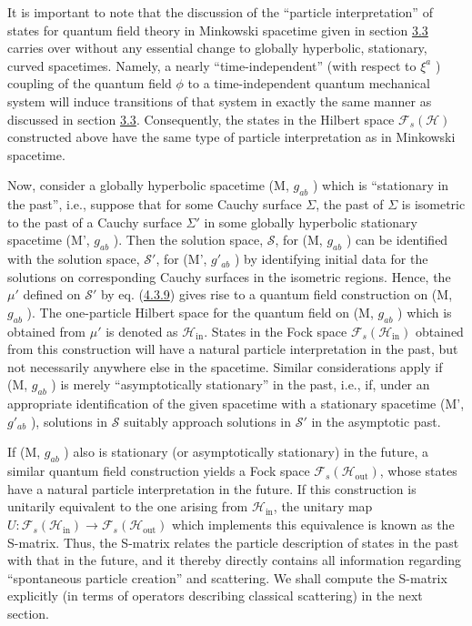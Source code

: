 \documentclass[11pt,a4paper]{article}
\begin{document}
It is important to note that the discussion of the ``particle interpretation'' of states for quantum field theory in Minkowski spacetime given in section \hyperlink{sec:3.3}{3.3} carries over without any essential change to globally hyperbolic, stationary, curved spacetimes. Namely, a nearly ``time-independent'' (with respect to \(\xi^a\) ) coupling of the quantum field \(\phi\) to a time-independent quantum mechanical system will induce transitions of that system in exactly the same manner as discussed in section \hyperlink{sec:3.3}{3.3}. Consequently, the states in the Hilbert space \(\mathcal{F}_s(\mathcal{H})\) constructed above have the same type of particle interpretation as in Minkowski spacetime.

Now, consider a globally hyperbolic spacetime (M, \(g_{ab}\) ) which is ``stationary in the past'', i.e., suppose that for some Cauchy surface \(\Sigma\), the past of \(\Sigma\) is isometric to the past of a Cauchy surface \(\Sigma'\) in some globally hyperbolic stationary spacetime (M', \(g_{ab}\) ). Then the solution space, \(\mathcal{S}\), for (M, \(g_{ab}\) ) can be identified with the solution space, \(\mathcal{S}'\), \hypertarget{source-77}{} for (M', \(g'_{ab}\) ) by identifying initial data for the solutions on corresponding Cauchy surfaces in the isometric regions. Hence, the \(\mu'\) defined on \(\mathcal{S}'\) by eq. (\hyperref[eq:4.3.9]{4.3.9}) gives rise to a quantum field construction on (M, \(g_{ab}\) ). The one-particle Hilbert space for the quantum field on (M, \(g_{ab}\) ) which is obtained from \(\mu'\) is denoted as \(\mathcal{H}_{\mathrm{in}}\). States in the Fock space \(\mathcal{F}_s(\mathcal{H}_{\mathrm{in}})\) obtained from this construction will have a natural particle interpretation in the past, but not necessarily anywhere else in the spacetime. Similar considerations apply if (M, \(g_{ab}\) ) is merely ``asymptotically stationary'' in the past, i.e., if, under an appropriate identification of the given spacetime with a stationary spacetime (M', \(g'_{ab}\) ), solutions in \(\mathcal{S}\) suitably approach solutions in \(\mathcal{S}'\) in the asymptotic past.

If (M, \(g_{ab}\) ) also is stationary (or asymptotically stationary) in the future, a similar quantum field construction yields a Fock space \(\mathcal{F}_s(\mathcal{H}_{\mathrm{out}})\), whose states have a natural particle interpretation in the future. If this construction is unitarily equivalent to the one arising from \(\mathcal{H}_{\mathrm{in}}\), the unitary map \(U:\mathcal{F}_s(\mathcal{H}_{\mathrm{in}}) \to \mathcal{F}_s(\mathcal{H}_{\mathrm{out}})\) which implements this equivalence is known as the S-matrix. Thus, the S-matrix relates the particle description of states in the past with that in the future, and it thereby directly contains all information regarding ``spontaneous particle creation'' and scattering. We shall compute the S-matrix explicitly (in terms of operators describing classical scattering) in the next section.
\end{document}
